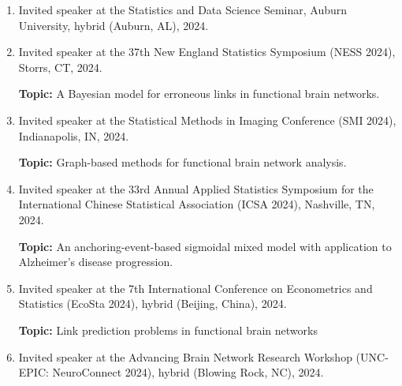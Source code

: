 \documentclass[12pt,letterpaper]{article}
\newenvironment{cventry}{\begin{minipage}[t]{\linewidth}}{\end{minipage}}
\begin{document}
\begin{enumerate}
\begin{cventry}
		Shanghai Center for Mathematical Sciences (Fudan 
		University), Shanghai, China, 2023.
		\par\end{cventry}
		\item\begin{cventry} Invited speaker at the Statistics and Data Science 
		Seminar, Auburn University, hybrid (Auburn, AL), 2024.
		\par\end{cventry}
		\item\begin{cventry} Invited speaker at the 37th New England Statistics 
		Symposium (NESS 2024), Storrs, CT, 2024. 
		
		\textbf{Topic:} A Bayesian model for erroneous links in 
		functional brain networks.
		\par\end{cventry}
		\item\begin{cventry} Invited speaker at the Statistical Methods in Imaging 
		Conference (SMI 2024), Indianapolis, IN, 2024. 
		
		\textbf{Topic:} Graph-based methods for functional brain 
		network analysis.
		\par\end{cventry}
		\item\begin{cventry} Invited speaker at the 33rd Annual Applied Statistics 
		Symposium for the International Chinese Statistical 
		Association (ICSA 2024), Nashville, TN, 2024. 
		
		\textbf{Topic:} An anchoring-event-based 
		sigmoidal mixed model with application to Alzheimer's disease 
		progression.
		\par\end{cventry}
		\item\begin{cventry} Invited speaker at the 7th International Conference on 
		Econometrics and Statistics (EcoSta 2024), hybrid (Beijing, 
		China), 2024.
		
		\textbf{Topic:} Link prediction problems in functional brain 
		networks
		\par\end{cventry}
		\item\begin{cventry} Invited speaker at the Advancing Brain Network 
		Research Workshop (UNC-EPIC: NeuroConnect 2024), hybrid 
		(Blowing Rock, NC), 2024.
		

\end{cventry}
\end{enumerate}
\end{document}
